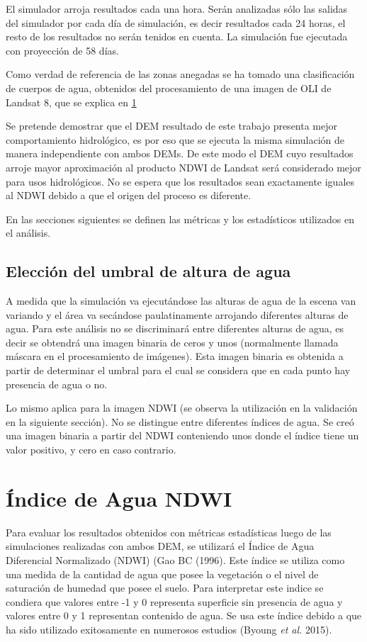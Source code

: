 \documentclass[10pt,a4paper, twoside]{report}
\begin{document}
El simulador arroja resultados cada una hora. Serán analizadas sólo las salidas del simulador por cada día de simulación, es decir resultados cada 24 horas, el resto de los resultados no serán tenidos en cuenta. La simulación fue ejecutada con proyección de 58 días.

Como verdad de referencia de las zonas anegadas se ha tomado una clasificación de cuerpos de agua, obtenidos del procesamiento de una imagen de OLI de Landsat 8, que se explica en \ref{indiceaguandwi}

Se pretende demostrar que el DEM resultado de este trabajo presenta mejor comportamiento hidrológico, es por eso que se ejecuta la misma simulación de manera independiente con ambos DEMs. De este modo el DEM cuyo resultados arroje mayor aproximación al producto NDWI de Landsat será considerado mejor para usos hidrológicos. No se espera que los resultados sean exactamente iguales al NDWI debido a que el origen del proceso es diferente.

En las secciones siguientes se definen las métricas y los estadísticos utilizados en el análisis.

\subsection{Elección del umbral de altura de agua}

A medida que la simulación va ejecutándose las alturas de agua de la escena van variando y el área va secándose paulatinamente arrojando diferentes alturas de agua. Para este análisis no se discriminará entre diferentes alturas de agua, es decir se obtendrá una imagen binaria de ceros y unos (normalmente llamada máscara en el procesamiento de imágenes). Esta imagen binaria es obtenida a partir de determinar el umbral para el cual se considera que en cada punto hay presencia de agua o no.

Lo mismo aplica para la imagen NDWI (se observa la utilización en la validación en la siguiente sección). No se distingue entre diferentes índices de agua. Se creó una imagen binaria a partir del NDWI conteniendo unos donde el índice tiene un valor positivo, y cero en caso contrario.

\section{Índice de Agua NDWI}
\label{indiceaguandwi}

Para evaluar los resultados obtenidos con métricas estadísticas luego de las simulaciones realizadas con ambos DEM, se utilizará el Índice de Agua Diferencial Normalizado (NDWI) (Gao BC (1996). Este índice se utiliza como una medida de la cantidad de agua que posee la vegetación o el nivel de saturación de humedad que posee el suelo. Para interpretar este indice se condiera que valores entre -1 y 0 representa superficie sin presencia de agua y valores entre 0 y 1 representan contenido de agua. Se usa este índice debido a que ha sido utilizado exitosamente en numerosos estudios (Byoung \textit{et al.} 2015).
\end{document}
